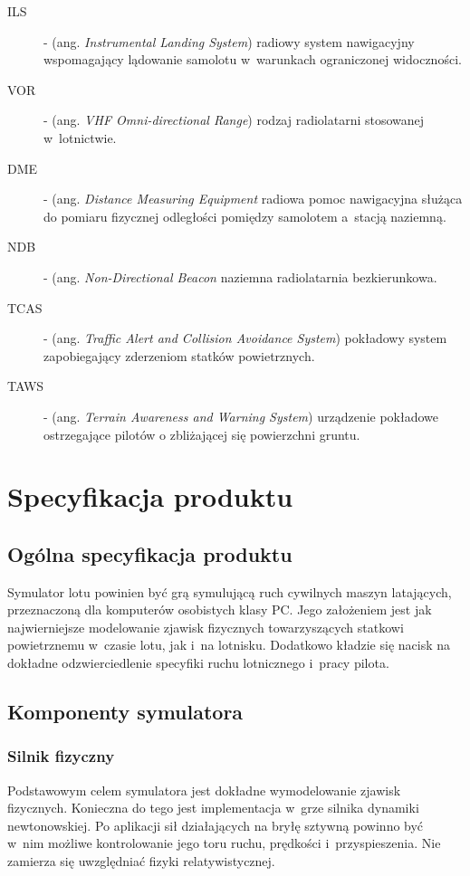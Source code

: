 \documentclass{mwrep}
\begin{document}
\begin{description}
\item[ILS] - (ang. \emph{Instrumental Landing System}) radiowy system nawigacyjny wspomagający lądowanie samolotu w~warunkach ograniczonej widoczności.
\item[VOR] - (ang. \emph{VHF Omni-directional Range}) rodzaj radiolatarni stosowanej w~lotnictwie.
\item[DME] - (ang. \emph{Distance Measuring Equipment} radiowa pomoc nawigacyjna służąca do pomiaru fizycznej odległości pomiędzy samolotem a~stacją naziemną.
\item[NDB] - (ang. \emph{Non-Directional Beacon} naziemna radiolatarnia bezkierunkowa.
\item[TCAS] - (ang. \emph{Traffic Alert and Collision Avoidance System}) pokładowy system zapobiegający zderzeniom statków powietrznych.
\item[TAWS] - (ang. \emph{Terrain Awareness and Warning System}) urządzenie pokładowe ostrzegające pilotów o zbliżającej się powierzchni gruntu.
\end{description}

\chapter{Specyfikacja produktu}

\section{Ogólna specyfikacja produktu}

Symulator lotu powinien być grą symulującą ruch cywilnych maszyn latających, przeznaczoną dla komputerów osobistych klasy PC. Jego założeniem jest jak najwierniejsze modelowanie zjawisk fizycznych towarzyszących statkowi powietrznemu w~czasie lotu, jak i~na lotnisku. Dodatkowo kładzie się nacisk na dokładne odzwierciedlenie specyfiki ruchu lotnicznego i~pracy pilota.

\section{Komponenty symulatora}

\subsection{Silnik fizyczny}

Podstawowym celem symulatora jest dokładne wymodelowanie zjawisk fizycznych. Konieczna do tego jest implementacja w~grze silnika dynamiki newtonowskiej. Po aplikacji sił działających na bryłę sztywną powinno być w~nim możliwe kontrolowanie jego toru ruchu, prędkości i~przyspieszenia. Nie zamierza się uwzględniać fizyki relatywistycznej.
\end{document}
